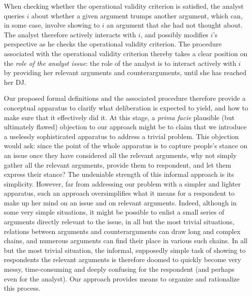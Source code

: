 \documentclass[version=3.21, pagesize, twoside=off, bibliography=totoc, DIV=calc, fontsize=12pt, a4paper, french, english]{scrartcl}
\begin{document}
When checking whether the operational validity criterion is satisfied, the analyst queries $i$ about whether a given argument trumps another argument, which can, in some case, involve showing to $i$ an argument that she had not thought about. The analyst therefore actively interacts with $i$, and possibly modifies $i$’s perspective as he checks the operational validity criterion. 
The procedure associated with the operational validity criterion thereby takes a clear position on the \emph{role of the analyst issue}: the role of the analyst is to interact actively with $i$ by providing her relevant arguments and counterarguments, until she has reached her \ac{DJ}.

Our proposed formal definitions and the associated procedure therefore provide a conceptual apparatus to clarify what deliberation is expected to yield, and how to make sure that it effectively did it. At this stage, a \emph{prima facie} plausible (but ultimately flawed) objection to our approach might be to claim that we introduce a uselessly sophisticated apparatus to address a trivial problem. This objection would ask: since the point of the whole apparatus is to capture people’s stance on an issue once they have considered all the relevant arguments, why not simply gather all the relevant arguments, provide them to respondent, and let them express their stance? The undeniable strength of this informal approach is its simplicity. However, far from addressing our problem with a simpler and lighter apparatus, such an approach oversimplifies what it means for a respondent to make up her mind on an issue and on relevant arguments. Indeed, although in some very simple situations, it might be possible to enlist a small series of arguments directly relevant to the issue, in all but the most trivial situations, relations between arguments and counterarguments can draw long and complex chains, and numerous arguments can find their place in various such chains. In all but the most trivial situation, the informal, supposedly simple task of showing to respondents the relevant arguments is therefore doomed to quickly become very messy, time-consuming and deeply confusing for the respondent (and perhaps even for the analyst). Our approach provides means to organize and rationalize this process.
\end{document}
